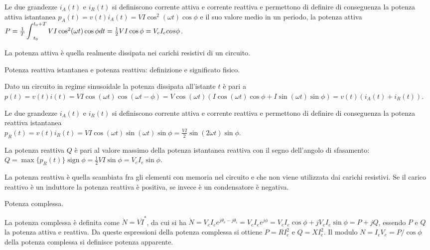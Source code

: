 \documentclass[answers, a4paper,12pt]{exam}
\DeclareMathOperator{\sign}{sign}
\newcommand{\bigint}{\mathop{\mathlarger{\int}}}
\begin{document}
\begin{questions}
\begin{solution}
		Le due grandezze $i_A (t)$ e $i_R (t)$ si definiscono corrente attiva e corrente reattiva e permettono di definire di conseguenza la potenza attiva istantanea $p_A (t) = v(t) i_A (t) = V I \cos^2 (\omega t) \cos \phi$ e il suo valore medio in un periodo, la potenza attiva $P = \frac{1}{T} \bigint_{t_0}^{t_0 + T}  V I \cos^2 (\omega t) \cos \phi dt =  \frac{1}{2} V I \cos \phi = V_e I_e cos \phi$. 
		
		La potenza attiva è quella realmente dissipata nei carichi resistivi di un circuito.
	\end{solution}
		\pagebreak
	\question
	Potenza reattiva istantanea e potenza reattiva: definizione e significato fisico.
	\begin{solution}		Dato un circuito in regime sinusoidale la potenza dissipata all'istante $t$ è pari a $p(t) = v(t) i(t) = V I \cos(\omega t) \cos(\omega t - \phi) = V \cos (\omega t)  (I \cos(\omega t) \cos \phi +  I \sin(\omega t) \sin \phi) = v(t) (i_A (t) + i_R(t))$. 
		
		Le due grandezze $i_A (t)$ e $i_R (t)$ si definiscono corrente attiva e corrente reattiva e permettono di definire di conseguenza la potenza reattiva istantanea\\ $p_R (t) = v(t) i_R (t) = V I \cos (\omega t) \sin (\omega t) \sin \phi =\frac{V I }{2} \sin (2 \omega t) \sin \phi$. 
		
		La potenza reattiva $Q$ è pari al valore massimo della potenza istantanea reattiva con il segno dell'angolo di sfasamento: $Q = \max\{p_R (t)\} \sign \phi = \frac{1}{2} V I \sin \phi = V_e I_e \sin \phi$.   
		
		La potenza reattiva è quella scambiata fra gli elementi con memoria nel circuito e che non viene utilizzata dai carichi resistivi. Se il carico reattivo è un induttore la potenza reattiva è positiva, se invece è un condensatore è negativa.\end{solution}
	\question
	Potenza complessa.
	\begin{solution}
		La potenza complessa è definita come $\dot{N} = \dot{V} \dot{I}^*$, da cui si ha $\dot{N} = V_e I_e e^{j \theta_v - j \theta_i} = V_e I_e e^{j \phi} = V_e I_e \cos \phi + j V_e I_e \sin \phi = P + jQ$, essendo $P$ e $Q$ la potenza attiva e reattiva. Da queste espressioni della potenza complessa si ottiene $P = R I_e ^2$ e $Q = X I_e ^2$. Il modulo $N = I_e V_e = P / \cos\phi$ della potenza complessa si definisce potenza apparente.
	\end{solution}
	

\end{questions}
\end{document}
